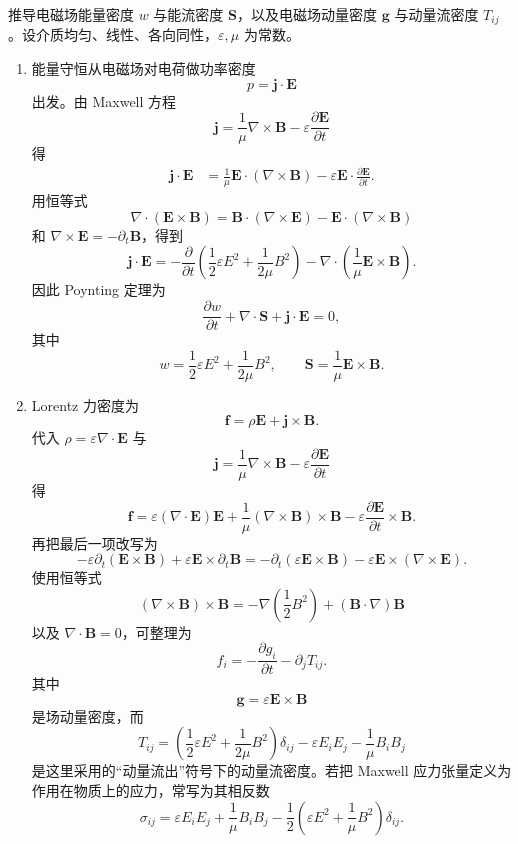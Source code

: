 

\begin{question}[电磁场能量与动量守恒]
推导电磁场能量密度 $w$ 与能流密度 $\mathbf S$，以及电磁场动量密度 $\mathbf g$ 与动量流密度 $T_{ij}$。设介质均匀、线性、各向同性，$\varepsilon,\mu$ 为常数。
\begin{solution}
\begin{enumerate}
  \item 能量守恒从电磁场对电荷做功率密度
  \[
    p=\mathbf j\cdot\mathbf E
  \]
  出发。由 Maxwell 方程
  \[
    \mathbf j=\frac1\mu\nabla\times\mathbf B-\varepsilon\frac{\partial\mathbf E}{\partial t}
  \]
  得
  \[
  \begin{aligned}
    \mathbf j\cdot\mathbf E
    &=\frac1\mu\mathbf E\cdot(\nabla\times\mathbf B)
      -\varepsilon\mathbf E\cdot\frac{\partial\mathbf E}{\partial t} .
  \end{aligned}
  \]
  用恒等式
  \[
    \nabla\cdot(\mathbf E\times\mathbf B)
    =\mathbf B\cdot(\nabla\times\mathbf E)-\mathbf E\cdot(\nabla\times\mathbf B)
  \]
  和 $\nabla\times\mathbf E=-\partial_t\mathbf B$，得到
  \[
    \mathbf j\cdot\mathbf E
    =-\frac{\partial}{\partial t}\left(\frac12\varepsilon E^2+\frac{1}{2\mu}B^2\right)
    -\nabla\cdot\left(\frac1\mu\mathbf E\times\mathbf B\right) .
  \]
  因此 Poynting 定理为
  \[
    \frac{\partial w}{\partial t}+\nabla\cdot\mathbf S+\mathbf j\cdot\mathbf E=0,
  \]
  其中
  \[
    \boxed{w=\frac12\varepsilon E^2+\frac{1}{2\mu}B^2,
    \qquad
    \mathbf S=\frac1\mu\mathbf E\times\mathbf B} .
  \]

  \item Lorentz 力密度为
  \[
    \mathbf f=\rho\mathbf E+\mathbf j\times\mathbf B .
  \]
  代入 $\rho=\varepsilon\nabla\cdot\mathbf E$ 与
  \[
    \mathbf j=\frac1\mu\nabla\times\mathbf B-\varepsilon\frac{\partial\mathbf E}{\partial t}
  \]
  得
  \[
    \mathbf f=\varepsilon(\nabla\cdot\mathbf E)\mathbf E
    +\frac1\mu(\nabla\times\mathbf B)\times\mathbf B
    -\varepsilon\frac{\partial\mathbf E}{\partial t}\times\mathbf B .
  \]
  再把最后一项改写为
  \[
    -\varepsilon\partial_t(\mathbf E\times\mathbf B)
    +\varepsilon\mathbf E\times\partial_t\mathbf B
    =-\partial_t(\varepsilon\mathbf E\times\mathbf B)
    -\varepsilon\mathbf E\times(\nabla\times\mathbf E) .
  \]
  使用恒等式
  \[
    (\nabla\times\mathbf B)\times\mathbf B
    =-\nabla\left(\frac12B^2\right)+(\mathbf B\cdot\nabla)\mathbf B
  \]
  以及 $\nabla\cdot\mathbf B=0$，可整理为
  \[
    f_i=-\frac{\partial g_i}{\partial t}-\partial_jT_{ij} .
  \]
  其中
  \[
    \boxed{\mathbf g=\varepsilon\mathbf E\times\mathbf B}
  \]
  是场动量密度，而
  \[
    \boxed{T_{ij}=\left(\frac12\varepsilon E^2+\frac{1}{2\mu}B^2\right)\delta_{ij}
    -\varepsilon E_iE_j-\frac1\mu B_iB_j}
  \]
  是这里采用的“动量流出”符号下的动量流密度。若把 Maxwell 应力张量定义为作用在物质上的应力，常写为其相反数
  \[
    \sigma_{ij}=\varepsilon E_iE_j+\frac1\mu B_iB_j-\frac12\left(\varepsilon E^2+\frac1\mu B^2\right)\delta_{ij} .
  \]
\end{enumerate}
\end{solution}
\end{question}

